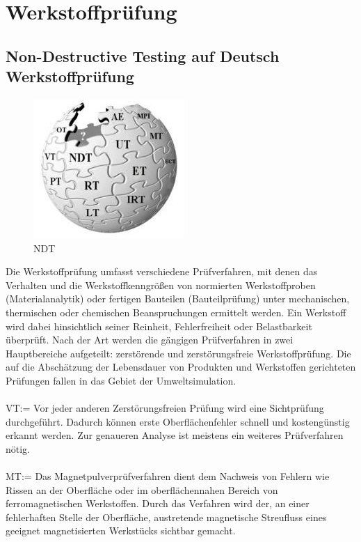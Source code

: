 \chapter{Werkstoffprüfung}
\label{sec:grundlagen}


\section{Non-Destructive Testing auf Deutsch Werkstoffprüfung}
\label{sec:ndt}
\begin{figure}[htb]
  \centering  
  \includegraphics[scale=0.9]{img/ndtazWiki.jpg}
  \caption{NDT}
  \label{fig:ndtazWiki}
\end{figure}
Die Werkstoffprüfung umfasst verschiedene Prüfverfahren, mit denen das Verhalten und die
Werkstoffkenngrößen von normierten Werkstoffproben (Materialanalytik) oder fertigen Bauteilen
(Bauteilprüfung) unter mechanischen, thermischen oder chemischen Beanspruchungen ermittelt
werden.
Ein Werkstoff wird dabei hinsichtlich seiner Reinheit, Fehlerfreiheit oder Belastbarkeit überprüft. Nach
der Art werden die gängigen Prüfverfahren in zwei Hauptbereiche aufgeteilt: zerstörende und
zerstörungsfreie Werkstoffprüfung. Die auf die Abschätzung der Lebensdauer von Produkten und
Werkstoffen gerichteten Prüfungen fallen in das Gebiet der Umweltsimulation.\\
\\
VT:= Vor jeder anderen Zerstörungsfreien Prüfung wird eine Sichtprüfung durchgeführt. Dadurch
können erste Oberflächenfehler schnell und kostengünstig erkannt werden. Zur genaueren Analyse
ist meistens ein weiteres Prüfverfahren nötig.\\
\\
MT:= Das Magnetpulverprüfverfahren dient dem Nachweis von Fehlern wie Rissen an der Oberfläche
oder im oberflächennahen Bereich von ferromagnetischen Werkstoffen. Durch das Verfahren wird
der, an einer fehlerhaften Stelle der Oberfläche, austretende magnetische Streufluss eines geeignet
magnetisierten Werkstücks sichtbar gemacht.\\
